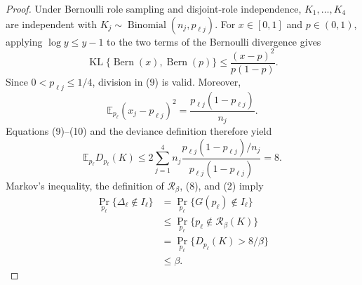 \documentclass{article}
\begin{document}
\begin{proof}
Under Bernoulli role sampling and disjoint-role independence, \(K_1,\ldots,K_4\) are independent with \(K_j\sim\operatorname{Binomial}(n_j,p_{\ell j})\).  For \(x\in[0,1]\) and \(p\in(0,1)\), applying \(\log y\leq y-1\) to the two terms of the Bernoulli divergence gives
\[
\operatorname{KL}\{\operatorname{Bern}(x),\operatorname{Bern}(p)\}
\leq\frac{(x-p)^2}{p(1-p)}.
\tag{9}
\]
Since \(0<p_{\ell j}\leq1/4\), division in (9) is valid.  Moreover,
\[
\mathbb E_{p_\ell}(x_j-p_{\ell j})^2
=\frac{p_{\ell j}(1-p_{\ell j})}{n_j}.
\tag{10}
\]
Equations (9)--(10) and the deviance definition therefore yield
\[
\mathbb E_{p_\ell}D_{p_\ell}(K)
\leq2\sum_{j=1}^4n_j
\frac{p_{\ell j}(1-p_{\ell j})/n_j}
{p_{\ell j}(1-p_{\ell j})}
=8.
\tag{11}
\]
Markov's inequality, the definition of \(\mathcal R_\beta\), (8), and (2) imply
\[
\begin{aligned}
\Pr_{p_\ell}\{\Delta_\ell\notin I_\ell\}
&=\Pr_{p_\ell}\{G(p_\ell)\notin I_\ell\}\\
&\leq\Pr_{p_\ell}\{p_\ell\notin\mathcal R_\beta(K)\}\\
&=\Pr_{p_\ell}\{D_{p_\ell}(K)>8/\beta\}\\
&\leq\beta.
\end{aligned}
\tag{12}
\]


\end{proof}
\end{document}
